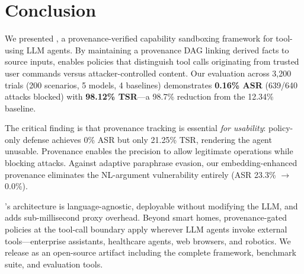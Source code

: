 \section{Conclusion}
\label{sec:conclusion}

We presented \sys{}, a provenance-verified capability sandboxing framework for tool-using LLM agents. By maintaining a provenance DAG linking derived facts to source inputs, \sys{} enables policies that distinguish tool calls originating from trusted user commands versus attacker-controlled content. Our evaluation across 3,200 trials (200 scenarios, 5 models, 4 baselines) demonstrates \textbf{0.16\% ASR} (639/640 attacks blocked) with \textbf{98.12\% TSR}---a 98.7\% reduction from the 12.34\% baseline.

The critical finding is that provenance tracking is essential \emph{for usability}: policy-only defense achieves 0\% ASR but only 21.25\% TSR, rendering the agent unusable. Provenance enables the precision to allow legitimate operations while blocking attacks. Against adaptive paraphrase evasion, our embedding-enhanced provenance eliminates the NL-argument vulnerability entirely (ASR 23.3\% $\to$ 0.0\%).

\sys{}'s architecture is language-agnostic, deployable without modifying the LLM, and adds sub-millisecond proxy overhead. Beyond smart homes, provenance-gated policies at the tool-call boundary apply wherever LLM agents invoke external tools---enterprise assistants, healthcare agents, web browsers, and robotics. We release \sys{} as an open-source artifact including the complete framework, benchmark suite, and evaluation tools.
